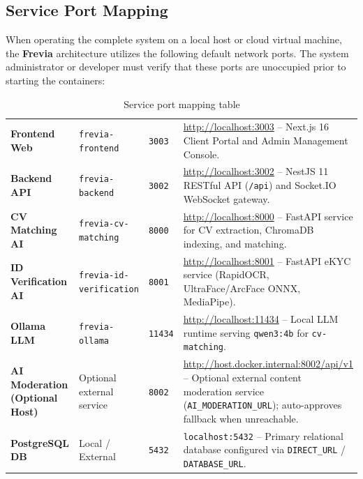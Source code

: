 
\subsection{Service Port Mapping}

When operating the complete system on a local host or cloud virtual machine, the \textbf{Frevia} architecture utilizes the following default network ports. The system administrator or developer must verify that these ports are unoccupied prior to starting the containers:

\begin{table}[H]
\centering
\caption{Service port mapping table}\label{tab:port_mapping}
\renewcommand{\arraystretch}{1.45}
\setlength{\tabcolsep}{5pt}
\begin{tabular}{|L{3.0cm}|L{4.0cm}|C{1.4cm}|L{6.1cm}|}
\hline
{} &  &  &  \\ \hline
\textbf{Frontend Web} & \texttt{frevia-frontend} & \texttt{3003} & \url{http://localhost:3003} -- Next.js 16 Client Portal and Admin Management Console. \\ \hline
\textbf{Backend API} & \texttt{frevia-backend} & \texttt{3002} & \url{http://localhost:3002} -- NestJS 11 RESTful API (\texttt{/api}) and Socket.IO WebSocket gateway. \\ \hline
\textbf{CV Matching AI} & \texttt{frevia-cv-matching} & \texttt{8000} & \url{http://localhost:8000} -- FastAPI service for CV extraction, ChromaDB indexing, and matching. \\ \hline
\textbf{ID Verification AI} & \texttt{frevia-\allowbreak{}id-\allowbreak{}verification} & \texttt{8001} & \url{http://localhost:8001} -- FastAPI eKYC service (RapidOCR, UltraFace/ArcFace ONNX, MediaPipe). \\ \hline
\textbf{Ollama LLM} & \texttt{frevia-ollama} & \texttt{11434} & \url{http://localhost:11434} -- Local LLM runtime serving \texttt{qwen3:4b} for \texttt{cv-matching}. \\ \hline
\textbf{AI Moderation (Optional Host)} & Optional external service & \texttt{8002} & \url{http://host.docker.internal:8002/api/v1} -- Optional external content moderation service (\texttt{AI\_MODERATION\_URL}); auto-approves fallback when unreachable. \\ \hline
\textbf{PostgreSQL DB} & Local / External & \texttt{5432} & \texttt{localhost:5432} -- Primary relational database configured via \texttt{DIRECT\_URL} / \texttt{DATABASE\_URL}. \\ \hline
\end{tabular}
\end{table}

